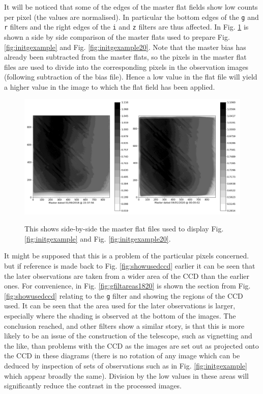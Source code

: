 It will be noticed that some of the edges of the master flat fields show low
counts per pixel (the values are normalised). In particular the bottom edges of
the \texttt{g} and \texttt{r} filters and the right edges of the \texttt{i} and
\texttt{z} filters are thus affected. In Fig. \ref{fig:complats1820} is shown a
side by side comparison of the master flats used to prepare Fig.
\ref{fig:initgexample} and Fig. \ref{fig:initgexample20}. Note that the master
bias has already been subtracted from the master flats, so the pixels in the
master flat files are used to divide into the corresponding pixels in the
observation images (following subtraction of the bias file). Hence a low value
in the flat file will yield a higher value in the image to which the flat field
has been applied.

\begin{figure}[!htbp]
\begin{center}
\includegraphics[scale=0.4]{images/complats1820.png}
\end{center}   
\caption{This shows side-by-side the master flat files used to display Fig.
\ref{fig:initgexample} and Fig. \ref{fig:initgexample20}.}
\protect\label{fig:complats1820}
\end{figure}

It might be supposed that this is a problem of the particular pixels concerned.
but if reference is made back to Fig. \ref{fig:showusedccd} earlier it can be
seen that the later observations are taken from a wider area of the CCD than the
earlier ones. For convenience, in Fig. \ref{fig:gfiltareas1820} is shown the
section from Fig. \ref{fig:showusedccd} relating to the \texttt{g} filter and
showing the regions of the CCD used. It can be seen that the area used for the
later observations is larger, especially where the shading is observed at the
bottom of the images. The conclusion reached, and other filters show a
similar story, is that this is more likely to be an issue of the
construction of the telescope, such as vignetting and the like, than problems
with the CCD as the images are set out as projected onto the CCD in these diagrams (there is no rotation of any
image which can be deduced by inspection of sets of observations such as in
Fig. \ref{fig:initgexample} which appear broadly the same). Division by the low
values in these areas will significantly reduce the contrast in the processed
images.

